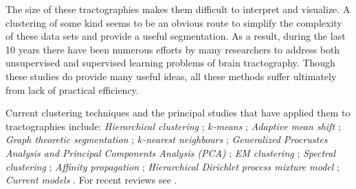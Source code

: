 \documentclass[journal]{IEEEtran}
\begin{document}
The size of these tractographies makes them difficult to interpret and
visualize. A clustering of some kind seems to be an obvious route to
simplify the complexity of these data sets and provide a useful
segmentation.  As a result, during the last 10 years there have been
numerous efforts by many researchers to address both unsupervised and
supervised learning problems of brain tractography. Though these studies
do provide many useful ideas, all these methods suffer ultimately from
lack of practical efficiency.

Current clustering techniques and the principal studies that have
applied them to tractographies include: \textit{Hierarchical clustering}
\cite{Visser2010, gerig2004analysis, Guevara2010, zhang2005dti,
  jianu2009exploring}; \textit{$k$-means} \cite{ElKouby2005, Tsai2007};
\textit{Adaptive mean shift} \cite{zvitia2008adaptive, Zvitia2010};
\textit{Graph theoretic segmentation} \cite{brun2004clustering};
\textit{$k$-nearest neighbours} \cite{Ding2003a}; \textit{Generalized
  Procrustes Analysis and Principal Components Analysis (PCA)}
\cite{Corouge2004, corouge2004towards, Corouge2006};
\textit{EM clustering} \cite{Maddah_MICCA2005, maddah2006statistical,
  Maddah_IEEEBI2008, ziyan2009consistency}; \textit{Spectral clustering}
\cite{jonasson2005fiber, ODonnell_IEEETMI07}; \textit{Affinity
  propagation} \cite{leemans17new, malcolm2009filtered};
\textit{Hierarchical Dirichlet process mixture model}
\cite{wang2010tractography}; \textit{Current models}
\cite{Durrleman2009, durrleman2010registration}. 
For recent reviews see \cite{ODonnell_IEEETMI07, wang2010tractography}.
\end{document}
